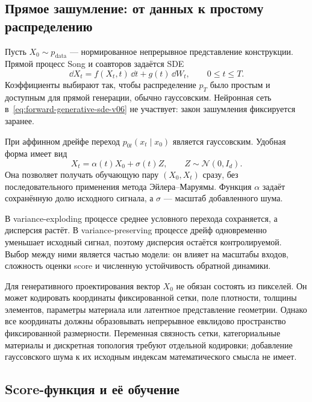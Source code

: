 \subsection{Прямое зашумление: от данных к простому распределению}

Пусть $X_0\sim p_{\mathrm{data}}$ --- нормированное непрерывное представление конструкции. Прямой процесс Song и соавторов задаётся SDE
\begin{equation}\label{eq:forward-generative-sde-v06}
\dd X_t = f(X_t,t)\,\dd t + g(t)\,\dd W_t, \qquad 0\leq t\leq T.
\end{equation}
Коэффициенты выбирают так, чтобы распределение $p_T$ было простым и доступным для прямой генерации, обычно гауссовским. Нейронная сеть в~\eqref{eq:forward-generative-sde-v06} не участвует: закон зашумления фиксируется заранее.

При аффинном дрейфе переход $p_{0t}(x_t\mid x_0)$ является гауссовским. Удобная форма имеет вид
\begin{equation}\label{eq:gaussian-perturbation-kernel-v06}
X_t = \alpha(t)X_0 + \sigma(t)Z, \qquad Z\sim\mathcal N(0,I_d).
\end{equation}
Она позволяет получать обучающую пару $(X_0,X_t)$ сразу, без последовательного применения метода Эйлера--Маруямы. Функция $\alpha$ задаёт сохранённую долю исходного сигнала, а $\sigma$ --- масштаб добавленного шума.

В variance-exploding процессе среднее условного перехода сохраняется, а дисперсия растёт. В variance-preserving процессе дрейф одновременно уменьшает исходный сигнал, поэтому дисперсия остаётся контролируемой. Выбор между ними является частью модели: он влияет на масштабы входов, сложность оценки score и численную устойчивость обратной динамики.

Для генеративного проектирования вектор $X_0$ не обязан состоять из пикселей. Он может кодировать координаты фиксированной сетки, поле плотности, толщины элементов, параметры материала или латентное представление геометрии. Однако все координаты должны образовывать непрерывное евклидово пространство фиксированной размерности. Переменная связность сетки, категориальные материалы и дискретная топология требуют отдельной кодировки; добавление гауссовского шума к их исходным индексам математического смысла не имеет.

\subsection{Score-функция и её обучение}


